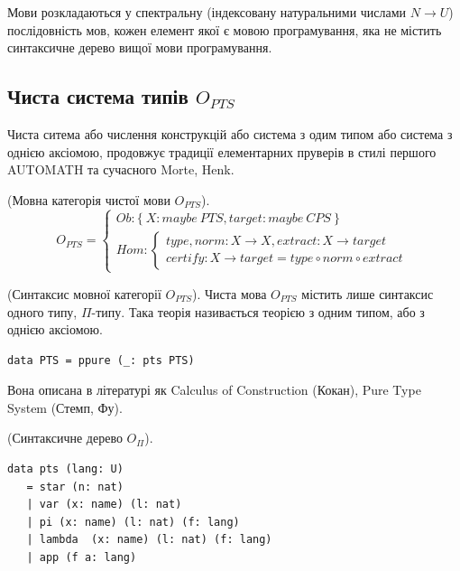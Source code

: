 Мови розкладаються у спектральну (індексовану натуральними числами $N \rightarrow U$)
послідовність мов, кожен елемент якої є мовою програмування,
яка не містить синтаксичне дерево вищої мови програмування.

\newpage
\subsection{Чиста система типів $O_{PTS}$}

Чиста ситема або числення конструкцій або система з одим типом або
система з однією аксіомою, продовжує традиції елементарних пруверів
в стилі першого AUTOMATH та сучасного Morte, Henk.

\begin{definition} (Мовна категорія чистої мови $O_{PTS}$).
\begin{equation}
O_{PTS} =
\begin{cases}
Ob: \{\ X: maybe\ PTS, target: maybe\ CPS \ \} \\
Hom: \begin{cases}
type,norm: X \rightarrow X, extract: X \rightarrow target \\
certify: X \rightarrow target = type \circ norm \circ extract
\end{cases}
\end{cases}
\end{equation}
\end{definition}

\begin{definition} (Синтаксис мовної категорії $O_{PTS}$).
Чиста мова $O_{PTS}$ містить лише синтаксис одного типу, $\Pi$-типу.
Така теорія називається теорією з одним типом, або з однією аксіомою.
\begin{lstlisting}
data PTS = ppure (_: pts PTS)
\end{lstlisting}
\end{definition}

Вона описана в літературі як Calculus of Construction (Кокан),
Pure Type System (Стемп, Фу).

\begin{definition} (Синтаксичне дерево $O_\Pi$).
\begin{lstlisting}[mathescape=true]
data pts (lang: U)
   = star (n: nat)
   | var (x: name) (l: nat)
   | pi (x: name) (l: nat) (f: lang)
   | lambda  (x: name) (l: nat) (f: lang)
   | app (f a: lang)
\end{lstlisting}
\end{definition}

